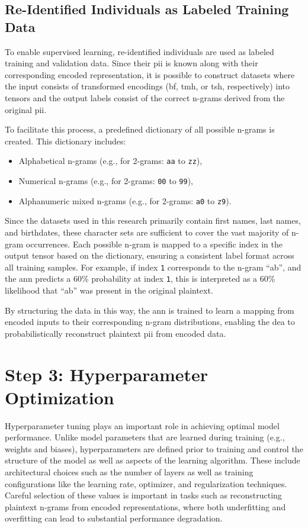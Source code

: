 \subsection{Re-Identified Individuals as Labeled Training Data}

To enable supervised learning, re-identified individuals are used as labeled training and validation data.
Since their \ac{pii} is known along with their corresponding encoded representation, it is possible to construct datasets where the input consists of transformed encodings (\ac{bf}, \ac{tmh}, or \ac{tsh}, respectively) into tensors and the output labels consist of the correct n-grams derived from the original \ac{pii}.

To facilitate this process, a predefined dictionary of all possible n-grams is created. This dictionary includes:
\begin{itemize}
   \item Alphabetical n-grams (e.g., for 2-grams: \texttt{aa} to \texttt{zz}),
   \item Numerical n-grams (e.g., for 2-grams: \texttt{00} to \texttt{99}),
   \item Alphanumeric mixed n-grams (e.g., for 2-grams: \texttt{a0} to \texttt{z9}).
\end{itemize}

Since the datasets used in this research primarily contain first names, last names, and birthdates, these character sets are sufficient to cover the vast majority of n-gram occurrences.
Each possible n-gram is mapped to a specific index in the output tensor based on the dictionary, ensuring a consistent label format across all training samples.
For example, if index \texttt{1} corresponds to the n-gram \enquote{ab}, and the \ac{ann} predicts a 60\% probability at index \texttt{1}, this is interpreted as a 60\% likelihood that \enquote{ab} was present in the original plaintext.

By structuring the data in this way, the \ac{ann} is trained to learn a mapping from encoded inputs to their corresponding n-gram distributions, enabling the \ac{dea} to probabilistically reconstruct plaintext \ac{pii} from encoded data.

\section{Step 3: Hyperparameter Optimization} \label{sec:hmo}

Hyperparameter tuning plays an important role in achieving optimal model performance.
Unlike model parameters that are learned during training (e.g., weights and biases), hyperparameters are defined prior to training and control the structure of the model as well as aspects of the learning algorithm.
These include architectural choices such as the number of layers as well as training configurations like the learning rate, optimizer, and regularization techniques.
Careful selection of these values is important in tasks such as reconstructing plaintext n-grams from encoded representations, where both underfitting and overfitting can lead to substantial performance degradation.

